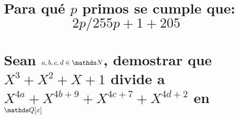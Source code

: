 \documentclass[a4paper,spanish]{article}
\begin{document}
\section{%
  Para qué $p$ primos se cumple que: 
  \[
    2p / 255p+1 + 205
  \]
}

\newpage
\section{%
  Sean $a,b,c,d \in \N$, demostrar que $X^3+X^2+X+1$ divide a \\
  $X^{4a}+ X^{4b+9} +X^{4c+7}+X^{4d+2}$ en $\Q[x]$
}
\end{document}
